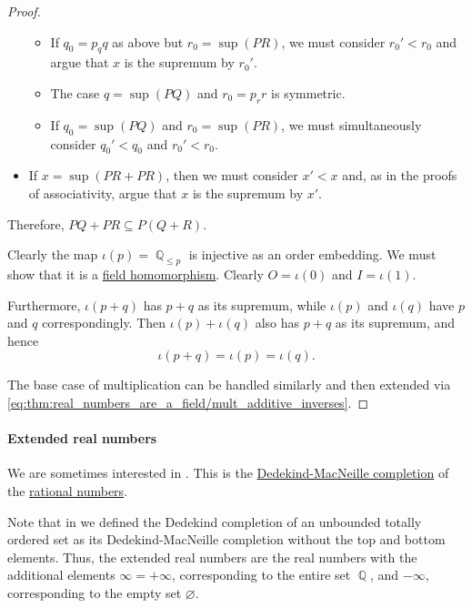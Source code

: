 \begin{proof}
\begin{itemize}
\begin{itemize}
      \item If \( q_0 = p_q q \) as above but \( r_0 = \sup(PR) \), we must consider \( r_0' < r_0 \) and argue that \( x \) is the supremum by \( r_0' \).

      \item The case \( q = \sup(PQ) \) and \( r_0 = p_r r \) is symmetric.

      \item If \( q_0 = \sup(PQ) \) and \( r_0 = \sup(PR) \), we must simultaneously consider \( q_0' < q_0 \) and \( r_0' < r_0 \).
    \end{itemize}

    \item If \( x = \sup(PR + PR) \), then we must consider \( x' < x \) and, as in the proofs of associativity, argue that \( x \) is the supremum by \( x' \).
  \end{itemize}

  Therefore, \( PQ + PR \subseteq P(Q + R) \).

   Clearly the map \( \iota(p) = \BbbQ_{\leq p} \) is injective as an order embedding. We must show that it is a \hyperref[def:field/homomorphism]{field homomorphism}. Clearly \( O = \iota(0) \) and \( I = \iota(1) \).

  Furthermore, \( \iota(p + q) \) has \( p + q \) as its supremum, while \( \iota(p) \) and \( \iota(q) \) have \( p \) and \( q \) correspondingly. Then \( \iota(p) + \iota(q) \) also has \( p + q \) as its supremum, and hence
  \begin{equation*}
    \iota(p + q) = \iota(p) = \iota(q).
  \end{equation*}

  The base case of multiplication can be handled similarly and then extended via \eqref{eq:thm:real_numbers_are_a_field/mult_additive_inverses}.
\end{proof}

\paragraph{Extended real numbers}

\begin{definition}\label{def:extended_real_numbers}\mimprovised
  We are sometimes interested in . This is the \hyperref[def:dedekind_macnielle_completion]{Dedekind-MacNeille completion} of the \hyperref[def:rational_numbers]{rational numbers}.

  Note that in  we defined the Dedekind completion of an unbounded totally ordered set as its Dedekind-MacNeille completion without the top and bottom elements. Thus, the extended real numbers are the real numbers with the additional elements \( \infty = +\infty \), corresponding to the entire set \( \BbbQ \), and \( -\infty \), corresponding to the empty set \( \varnothing \).
\end{definition}

